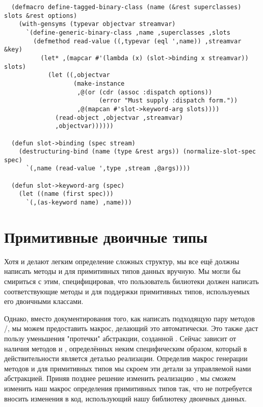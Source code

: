\begin{lstlisting}
  (defmacro define-tagged-binary-class (name (&rest superclasses) slots &rest options)
    (with-gensyms (typevar objectvar streamvar)
      `(define-generic-binary-class ,name ,superclasses ,slots
        (defmethod read-value ((,typevar (eql ',name)) ,streamvar &key)
          (let* ,(mapcar #'(lambda (x) (slot->binding x streamvar)) slots)
            (let ((,objectvar
                   (make-instance 
                    ,@(or (cdr (assoc :dispatch options))
                          (error "Must supply :dispatch form."))
                    ,@(mapcan #'slot->keyword-arg slots))))
              (read-object ,objectvar ,streamvar)
              ,objectvar))))))

  (defun slot->binding (spec stream)
    (destructuring-bind (name (type &rest args)) (normalize-slot-spec spec)
      `(,name (read-value ',type ,stream ,@args))))

  (defun slot->keyword-arg (spec)
    (let ((name (first spec)))
      `(,(as-keyword name) ,name)))
\end{lstlisting}

\section{Примитивные двоичные типы}

Хотя  и  делают легким
определение сложных структур, мы все ещё должны написать методы  и
 для примитивных типов данных вручную. Мы могли бы смириться с этим,
специфицировав, что пользователь билиотеки должен написать соответствующие методы
 и  для поддержки примитивных типов, используемых его
двоичными классами.

Однако, вместо документирования того, как написать подходящую пару методов
/, мы можем предоставить макрос, делающий это
автоматически. Это также даст пользу уменьшения "протечки" абстракции, созданной
. Сейчас  зависит от наличия методов
 и , определённых неким специфическим образом, который
в действительности является деталью реализации. Определив макрос генерации методов
 и  для примитивных типов мы скроем эти детали за
управляемой нами абстракцией. Приняв позднее решение изменить реализацию
, мы сможем изменить наш макрос определения примитивных типов
так, что не потребуется вносить изменения в код, использующий нашу библиотеку двоичных
данных.

